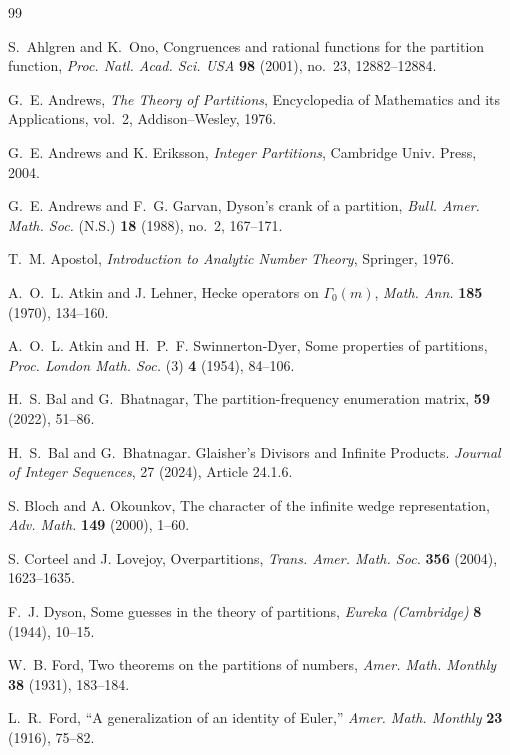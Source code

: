 \documentclass[11pt]{article}
\theoremstyle{definition}
\theoremstyle{remark}
\begin{document}
\begin{thebibliography}{99}

S.~Ahlgren and K.~Ono,
Congruences and rational functions for the partition function,
\emph{Proc. Natl. Acad. Sci. USA} \textbf{98} (2001), no.~23, 12882--12884.

G.~E. Andrews,
\emph{The Theory of Partitions},
Encyclopedia of Mathematics and its Applications, vol.~2, Addison--Wesley, 1976.

G.~E. Andrews and K. Eriksson,
\emph{Integer Partitions},
Cambridge Univ. Press, 2004.

G.~E. Andrews and F.~G. Garvan,
Dyson’s crank of a partition,
\emph{Bull. Amer. Math. Soc.} (N.S.) \textbf{18} (1988), no.~2, 167--171.

T.~M. Apostol,
\emph{Introduction to Analytic Number Theory},
Springer, 1976.

A.~O.~L. Atkin and J. Lehner,
Hecke operators on $\Gamma_0(m)$,
\emph{Math. Ann.} \textbf{185} (1970), 134--160.

A.~O.~L. Atkin and H.~P.~F. Swinnerton-Dyer,
Some properties of partitions,
\emph{Proc. London Math. Soc.} (3) \textbf{4} (1954), 84--106.

H.~S. Bal and G.~Bhatnagar,
\newblock The partition-frequency enumeration matrix,
 {\bf 59} (2022), 51--86.

H.~S.~Bal and G.~Bhatnagar.
\newblock Glaisher's Divisors and Infinite Products.
\newblock \emph{Journal of Integer Sequences}, 27 (2024), Article 24.1.6.

S. Bloch and A. Okounkov,
The character of the infinite wedge representation,
\emph{Adv. Math.} \textbf{149} (2000), 1--60.

S. Corteel and J. Lovejoy,
Overpartitions,
\emph{Trans. Amer. Math. Soc.} \textbf{356} (2004), 1623--1635.

F.~J. Dyson,
Some guesses in the theory of partitions,
\emph{Eureka (Cambridge)} \textbf{8} (1944), 10--15.

W.~B. Ford,
Two theorems on the partitions of numbers,
\emph{Amer. Math. Monthly} \textbf{38} (1931), 183--184.

L.~R.~Ford, ``A generalization of an identity of Euler,''
\emph{Amer. Math. Monthly} \textbf{23} (1916), 75--82.



\end{thebibliography}
\end{document}
